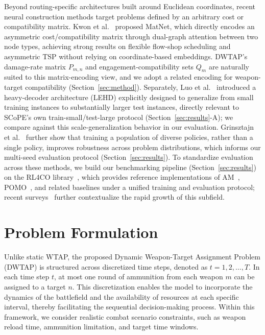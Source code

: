 \documentclass[smallcondensed]{svjour3}
\begin{document}
Beyond routing-specific architectures built around Euclidean coordinates, recent neural construction methods target problems defined by an arbitrary cost or compatibility matrix. Kwon et al.~\cite{kwon2021matrix} proposed MatNet, which directly encodes an asymmetric cost/compatibility matrix through dual-graph attention between two node types, achieving strong results on flexible flow-shop scheduling and asymmetric TSP without relying on coordinate-based embeddings. DWTAP's damage-rate matrix $P_{m,n}$ and engagement-compatibility sets $Q_m$ are naturally suited to this matrix-encoding view, and we adopt a related encoding for weapon-target compatibility (Section~\ref{sec:method}). Separately, Luo et al.~\cite{luo2023lehd} introduced a heavy-decoder architecture (LEHD) explicitly designed to generalize from small training instances to substantially larger test instances, directly relevant to SCoPE's own train-small/test-large protocol (Section~\ref{sec:results}-A); we compare against this scale-generalization behavior in our evaluation. Grinsztajn et al.~\cite{grinsztajn2023winner} further show that training a population of diverse policies, rather than a single policy, improves robustness across problem distributions, which informs our multi-seed evaluation protocol (Section~\ref{sec:results}). To standardize evaluation across these methods, we build our benchmarking pipeline (Section~\ref{sec:results}) on the RL4CO library~\cite{berto2023rl4co}, which provides reference implementations of AM~\cite{kool2018attention}, POMO~\cite{kwon2020pomo}, and related baselines under a unified training and evaluation protocol; recent surveys~\cite{mazyavkina2021reinforcement,bogyrbayeva2024survey} further contextualize the rapid growth of this subfield.

\section{Problem Formulation}
\label{sec:problem}

Unlike static WTAP, the proposed Dynamic Weapon-Target Assignment Problem (DWTAP) is structured across discretized time steps, denoted as $t = 1, 2, \ldots, T$. In each time step $t$, at most one round of ammunition from each weapon $m$ can be assigned to a target $n$. This discretization enables the model to incorporate the dynamics of the battlefield and the availability of resources at each specific interval, thereby facilitating the sequential decision-making process. Within this framework, we consider realistic combat scenario constraints, such as weapon reload time, ammunition limitation, and target time windows.
\end{document}
